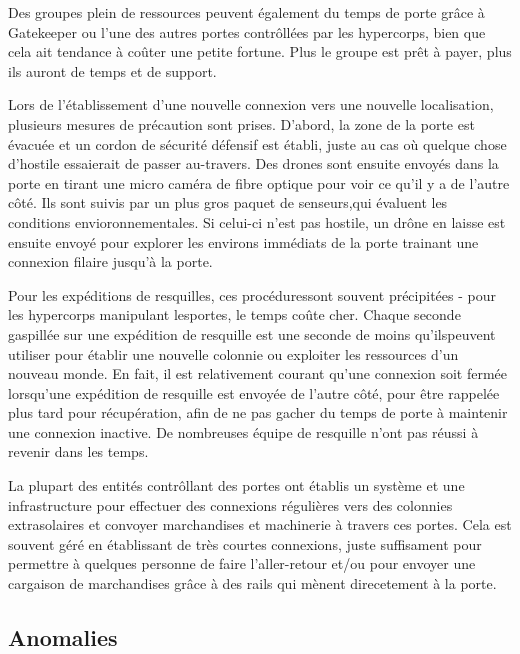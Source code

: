 Des groupes plein de ressources peuvent également du temps de porte grâce à Gatekeeper ou l'une des autres portes contrôllées par les hypercorps, bien que cela ait tendance à coûter une petite fortune. Plus le groupe est prêt à payer, plus ils auront de temps et de support. 

Lors de l'établissement d'une nouvelle connexion vers une nouvelle localisation, plusieurs mesures de précaution sont prises. D'abord, la zone de la porte est évacuée et un cordon de sécurité défensif est établi, juste au cas où quelque chose d'hostile essaierait de passer au-travers. Des drones sont ensuite envoyés dans la porte en tirant une micro caméra de fibre optique pour voir ce qu'il y a de l'autre côté. Ils sont suivis par un plus gros paquet de senseurs,qui évaluent les conditions envioronnementales. Si celui-ci n'est pas hostile, un drône en laisse est ensuite envoyé pour explorer les environs immédiats de la porte trainant une connexion filaire jusqu'à la porte. 

Pour les expéditions de resquilles, ces procéduressont souvent précipitées - pour les hypercorps manipulant lesportes, le temps coûte cher. Chaque seconde gaspillée sur une expédition de resquille est une seconde de moins qu'ilspeuvent utiliser pour établir une nouvelle colonnie ou exploiter les ressources d'un nouveau monde. En fait, il est relativement courant qu'une connexion soit fermée lorsqu'une expédition de resquille est envoyée de l'autre côté, pour être rappelée plus tard pour récupération, afin de ne pas gacher du temps de porte à maintenir une connexion inactive. De nombreuses équipe de resquille n'ont pas réussi à revenir dans les temps. 

La plupart des entités contrôllant des portes ont établis un système et une infrastructure pour effectuer des connexions régulières vers des colonnies extrasolaires et convoyer marchandises et machinerie à travers ces portes.  Cela est souvent géré en établissant de très courtes connexions, juste suffisament pour permettre à quelques personne de faire l'aller-retour et/ou pour envoyer une cargaison de marchandises grâce à des rails qui mènent direcetement à la porte. 

\subsection{Anomalies} 

